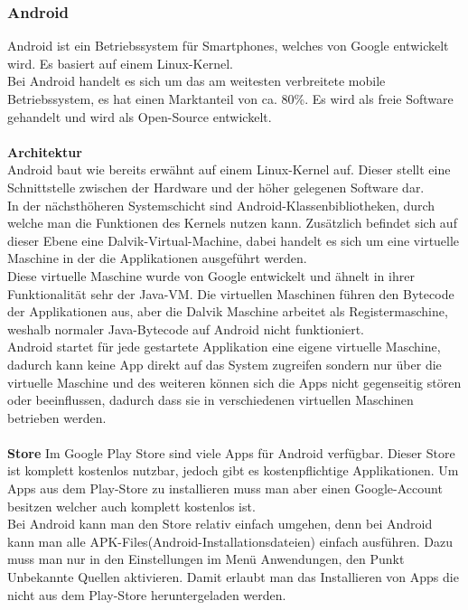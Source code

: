 \subsubsection{Android}
Android ist ein Betriebssystem für Smartphones, welches von Google entwickelt wird. Es basiert auf einem Linux-Kernel.\\
Bei Android handelt es sich um das am weitesten verbreitete mobile Betriebssystem, es hat einen Marktanteil von ca. 80\%. Es wird als freie Software gehandelt und wird als Open-Source entwickelt.\\
\\
\textbf{Architektur}\\
Android baut wie bereits erwähnt auf einem Linux-Kernel auf.  Dieser stellt eine Schnittstelle zwischen der Hardware und der höher gelegenen Software dar.\\
In der nächsthöheren Systemschicht sind Android-Klassenbibliotheken, durch welche man die Funktionen des Kernels nutzen kann. Zusätzlich befindet sich auf dieser Ebene eine Dalvik-Virtual-Machine, dabei handelt es sich um eine virtuelle Maschine in der die Applikationen ausgeführt werden.\\
Diese virtuelle Maschine wurde von Google entwickelt und ähnelt in ihrer Funktionalität sehr der Java-VM. Die virtuellen Maschinen führen den Bytecode der Applikationen aus, aber die Dalvik Maschine arbeitet als Registermaschine, weshalb normaler Java-Bytecode auf Android nicht funktioniert.\\
Android startet für jede gestartete Applikation eine eigene virtuelle Maschine, dadurch kann keine App direkt auf das System zugreifen sondern nur über die virtuelle Maschine und des weiteren können sich die Apps nicht gegenseitig stören oder beeinflussen, dadurch dass sie in verschiedenen virtuellen Maschinen betrieben werden.\\
\\
\textbf{Store}
Im Google Play Store sind viele Apps für Android verfügbar. Dieser Store ist komplett kostenlos nutzbar, jedoch gibt es kostenpflichtige Applikationen. Um Apps aus dem Play-Store zu installieren muss man aber einen Google-Account besitzen welcher auch komplett kostenlos ist.\\
Bei Android kann man den Store relativ einfach umgehen, denn bei Android kann man alle APK-Files(Android-Installationsdateien) einfach ausführen. Dazu muss man nur in den Einstellungen im Menü Anwendungen, den Punkt Unbekannte Quellen aktivieren. Damit erlaubt man das Installieren von Apps die nicht aus dem Play-Store heruntergeladen werden.\\
